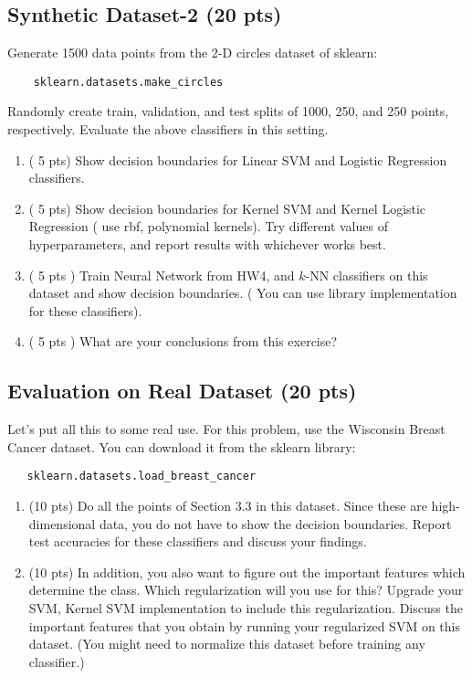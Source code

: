 \documentclass[a4paper]{article}
\theoremstyle{definition}
\begin{document}
\subsection{Synthetic Dataset-2 (20 pts)}
Generate 1500 data points from the 2-D circles dataset of sklearn:\begin{verbatim}
    sklearn.datasets.make_circles
\end{verbatim}
Randomly create train, validation, and test splits of 1000, 250, and 250 points, respectively. Evaluate the above classifiers in this setting.
\begin{enumerate}
    \item ( 5 pts) Show decision boundaries for Linear SVM and Logistic Regression classifiers.
\item ( 5 pts) Show decision boundaries for Kernel SVM and Kernel Logistic Regression ( use rbf, polynomial
kernels). Try different values of hyperparameters, and report results with whichever works best.

\item ( 5 pts ) Train Neural Network from HW4, and $k$-NN classifiers on this dataset and show decision boundaries. ( You can use library implementation for these classifiers).

\item ( 5 pts ) What are your conclusions from this exercise?
\end{enumerate}
\subsection{Evaluation on Real Dataset (20 pts)}
Let's put all this to some real use. For this problem, use the Wisconsin Breast Cancer dataset. You can download it from the sklearn library:
\begin{verbatim}
   sklearn.datasets.load_breast_cancer
\end{verbatim}
\begin{enumerate}
    \item  (10 pts) Do all the points of Section 3.3 in this dataset. Since these are high-dimensional data, you do not have to show the decision boundaries. Report test accuracies for these classifiers and discuss your findings.
\item (10 pts) In addition, you also want to figure out the important features which determine the class. Which regularization will you use for this? Upgrade your SVM, Kernel SVM implementation to include this
regularization. Discuss the important features that you obtain by running your regularized SVM on this dataset. (You might need to normalize this dataset before training any classifier.)
\end{enumerate}
\end{document}
